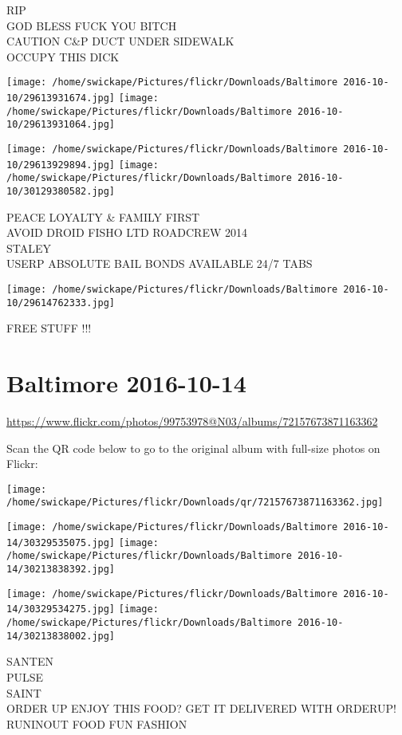 \documentclass[10pt,letterpaper]{article}
\begin{document}
RIP\\
GOD BLESS FUCK YOU BITCH\\
CAUTION C\&P DUCT UNDER SIDEWALK\\
OCCUPY THIS DICK
\pagebreak

\texttt{[image: /home/swickape/Pictures/flickr/Downloads/Baltimore 2016-10-10/29613931674.jpg]}
\texttt{[image: /home/swickape/Pictures/flickr/Downloads/Baltimore 2016-10-10/29613931064.jpg]}

\texttt{[image: /home/swickape/Pictures/flickr/Downloads/Baltimore 2016-10-10/29613929894.jpg]}
\texttt{[image: /home/swickape/Pictures/flickr/Downloads/Baltimore 2016-10-10/30129380582.jpg]}

PEACE LOYALTY \& FAMILY FIRST\\
AVOID DROID FISHO LTD ROADCREW 2014\\
STALEY\\
USERP ABSOLUTE BAIL BONDS AVAILABLE 24/7 TABS
\pagebreak

\texttt{[image: /home/swickape/Pictures/flickr/Downloads/Baltimore 2016-10-10/29614762333.jpg]}

FREE STUFF !!!
\pagebreak

\section*{Baltimore 2016-10-14}

\url{https://www.flickr.com/photos/99753978@N03/albums/72157673871163362}

Scan the QR code below to go to the original album with full-size photos on Flickr:

\texttt{[image: /home/swickape/Pictures/flickr/Downloads/qr/72157673871163362.jpg]}
\pagebreak

\texttt{[image: /home/swickape/Pictures/flickr/Downloads/Baltimore 2016-10-14/30329535075.jpg]}
\texttt{[image: /home/swickape/Pictures/flickr/Downloads/Baltimore 2016-10-14/30213838392.jpg]}

\texttt{[image: /home/swickape/Pictures/flickr/Downloads/Baltimore 2016-10-14/30329534275.jpg]}
\texttt{[image: /home/swickape/Pictures/flickr/Downloads/Baltimore 2016-10-14/30213838002.jpg]}

SANTEN\\
PULSE\\
SAINT\\
ORDER UP ENJOY THIS FOOD?  GET IT DELIVERED WITH ORDERUP!  RUNINOUT FOOD FUN FASHION
\pagebreak
\end{document}
